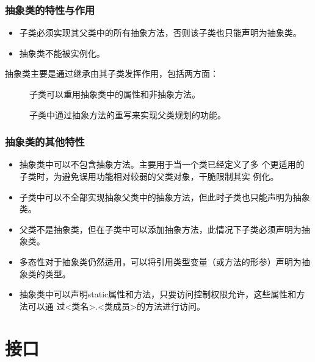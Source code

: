 \begin{frame}[fragile] %
  \frametitle{抽象类的特性与作用}


  \begin{itemize}[<+-| alert@+>]
  \item 子类必须实现其父类中的所有抽象方法，否则该子类也只能声明为抽象类。
  \item 抽象类不能被实例化。
  \end{itemize}

  \pause
  
  抽象类主要是通过继承由其子类发挥作用，包括两方面：
  
  \begin{description}
  \item[] 子类可以重用抽象类中的属性和非抽象方法。
  \item[] 子类中通过抽象方法的重写来实现父类规划的功能。
  \end{description}
\end{frame}


\begin{frame}[fragile] %
  \frametitle{抽象类的其他特性}
  
  \begin{itemize}[<+-| alert@+>]
  \item 抽象类中可以不包含抽象方法。{\kai 主要用于当一个类已经定义了多
      个更适用的子类时，为避免误用功能相对较弱的父类对象，干脆限制其实
      例化。}
  \item 子类中可以不全部实现抽象父类中的抽象方法，但此时子类也只能声明为抽象类。
  \item 父类不是抽象类，但在子类中可以添加抽象方法，此情况下子类必须声明为抽象类。
  \item 多态性对于抽象类仍然适用，可以将引用类型变量（或方法的形参）声明为抽象类的类型。
  \item 抽象类中可以声明static属性和方法，只要访问控制权限允许，这些属性和方法可以通
    过{\kai <类名>.<类成员>}的方法进行访问。
  \end{itemize}
\end{frame}

\section{接口}


